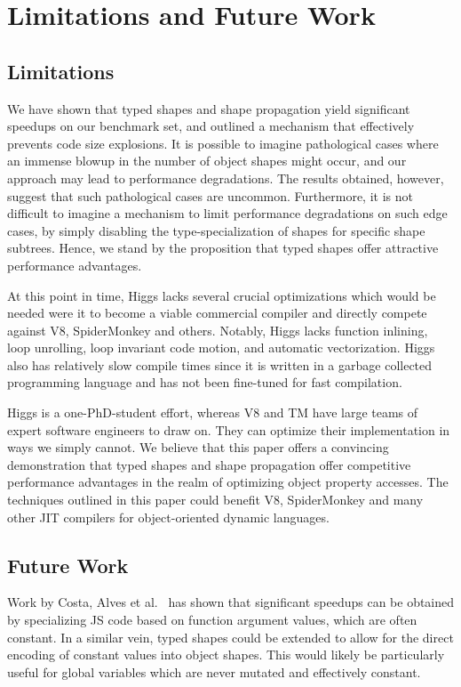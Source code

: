 \documentclass[preprint]{sigplanconf}
\begin{document}
 
\section{Limitations and Future Work}
\subsection{Limitations\label{sec:limitations}}

We have shown that typed shapes and shape propagation yield significant
speedups on our benchmark set, and outlined a mechanism that effectively
prevents code size explosions. It is possible to imagine pathological cases
where an immense blowup in the number of object shapes might occur, and our
approach may lead to performance degradations. The results obtained, however,
suggest that such pathological cases are uncommon. Furthermore, it is not
difficult to imagine a mechanism to limit performance degradations on such
edge cases, by simply disabling the type-specialization of shapes for specific
shape subtrees. Hence, we stand by the proposition that typed shapes offer
attractive performance advantages.

At this point in time, Higgs lacks several crucial optimizations which would
be needed were it to become a viable commercial compiler and directly compete
against V8, SpiderMonkey and others. Notably, Higgs lacks function inlining, loop
unrolling, loop invariant code motion, and automatic vectorization. Higgs also
has relatively slow compile times since it is written in a garbage collected
programming language and has not been fine-tuned for fast compilation.

Higgs is a one-PhD-student effort, whereas V8 and TM have large teams
of expert software engineers to draw on. They can optimize their implementation
in ways we simply cannot. We believe that this paper offers a convincing
demonstration that typed shapes and shape propagation offer competitive
performance advantages in the realm of optimizing object property accesses.
The techniques outlined in this paper could benefit V8, SpiderMonkey and many
other JIT compilers for object-oriented dynamic languages.

\subsection{Future Work\label{sec:future}}

Work by Costa, Alves et al.~\cite{jit_value_spec} has shown that significant
speedups can be obtained by specializing JS code based on function
argument values, which are often constant. In a similar vein, typed shapes
could be extended to allow for the direct encoding of constant values into
object shapes. This would likely be particularly useful for global variables
which are never mutated and effectively constant.
\end{document}
